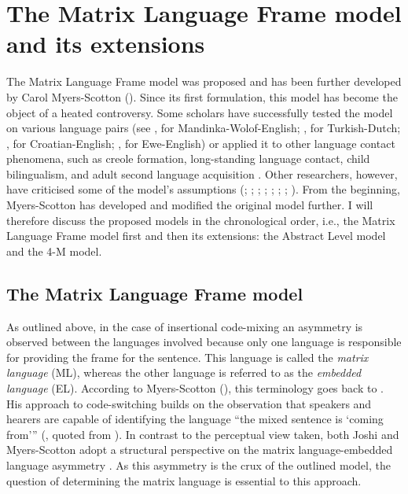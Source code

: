 \section{The Matrix Language Frame model and its extensions}\label{MLF}
\begin{sloppypar}
The Matrix Language Frame model was proposed and has been further developed by Carol Myers-Scotton  (\citeyear{myers-scotton-duelling-1993,myers-scotton-contact-2002}). Since its first formulation, this model has become the object of a heated controversy. Some scholars have successfully tested the model on various language pairs (see \citealt[]{haust-codeswitching-1995}, for Mandinka-Wolof-English;  \citealt[]{backus-two-1996}, for Turkish-Dutch;  \citealt[]{hlavac-second-generation-2003}, for Croatian-English;
\citealt[][]{amuzu-composite-2010}, for Ewe-English) or applied it to other language contact phenomena, such as creole formation, long-standing language contact, child bilingualism, and adult second language acquisition \citep[cf.][]{myers-scotton-testing-2000}. Other researchers, however, have criticised some of the model's assumptions (\citealt{meechan-orphan-1995}; \citealt{halmari-government-1997};   \citealt{jacobson-codeswitching-1998};  \citealt{boumans-syntax-1998}; \citealt{auer-embedded-2005};  \citealt{muhamedowa-untersuchung-2006};  \citealt{bullock-toribio-chang};  \citealt{zabrodskaja-evaluating-2009}). From the beginning, Myers-Scotton has developed and modified the original model further. I will therefore discuss the proposed models in the chronological order, i.e., the Matrix Language Frame model first and then its extensions: the Abstract Level model and the 4-M model.
\end{sloppypar}

\subsection {The Matrix Language Frame model}
As outlined above, in the case of insertional code-mixing an asymmetry is observed between the languages involved because only one language is responsible for providing the frame for the sentence. This language is called the \textit{matrix language} (ML), whereas the other language is referred to as the \textit{embedded language} (EL). According to Myers-Scotton (\citeyear{myers-scotton-duelling-1993}), this terminology goes back to \citet{joshi85}. His approach to code-switching builds on the observation that speakers and hearers are capable of identifying the language ``the mixed sentence is `coming from''' (\citealt{joshi85}, quoted from \citealt[35]{myers-scotton-duelling-1993}). In contrast to the perceptual view taken, both Joshi and Myers-Scotton adopt a structural perspective on the matrix language-embedded language asymmetry \citep[cf.][35--37]{myers-scotton-duelling-1993}. As this asymmetry is the crux of the outlined model, the question of determining the matrix language is essential to this approach. 

